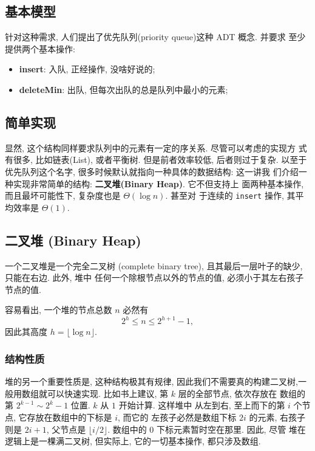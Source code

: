 \documentclass[a4paper]{ctexart}
\theoremstyle{definition}
\theoremstyle{definition}
\begin{document}
\subsection{基本模型}

针对这种需求, 人们提出了优先队列(priority queue)这种 ADT 概念. 并要求
至少提供两个基本操作:

\begin{itemize}
\item {\bf insert}: 入队, 正经操作, 没啥好说的;
\item {\bf deleteMin}: 出队, 但每次出队的总是队列中最小的元素; 
\end{itemize}

\subsection{简单实现}

显然, 这个结构同样要求队列中的元素有一定的序关系. 尽管可以考虑的实现方
式有很多, 比如链表(List), 或者平衡树. 但是前者效率较低, 后者则过于复杂.
以至于优先队列这个名字, 很多时候默认就指向一种具体的数据结构: 这一讲我
们介绍一种实现非常简单的结构: {\bf 二叉堆(Binary Heap)}.  它不但支持上
面两种基本操作, 而且最坏可能性下, 复杂度也是 $\Theta(\log n)$. 甚至对
于连续的 \verb|insert| 操作, 其平均效率是 $\Theta(1)$.

\subsection{二叉堆 (Binary Heap)}

 一个二叉堆是一个完全二叉树
(complete binary tree), 且其最后一层叶子的缺少, 只能在右边. 此外, 堆中
任何一个除根节点以外的节点的值, 必须小于其左右孩子节点的值.

容易看出, 一个堆的节点总数 $n$ 必然有
$$
2^h \leq n \leq 2^{h + 1} - 1,
$$
因此其高度 $h = \lfloor \log n \rfloor$.

\subsubsection{结构性质}

堆的另一个重要性质是, 这种结构极其有规律, 因此我们不需要真的构建二叉树,一
般用数组就可以快速实现. 比如书上建议, 第 $k$ 层的全部节点, 依次存放在
数组的第 $2^{k-1} \sim 2^{k} - 1$ 位置. $k$ 从 $1$ 开始计算. 这样堆中
从左到右, 至上而下的第 $i$ 个节点, 它存放在数组中的下标是 $i$, 而它的
左孩子必然是数组下标 $2i$ 的元素, 右孩子则是 $2i + 1$, 父节点是
$\lfloor i / 2\rfloor$. 数组中的 $0$ 下标元素暂时空在那里. 因此, 尽管
堆在逻辑上是一棵满二叉树, 但实际上, 它的一切基本操作, 都只涉及数组.
\end{document}
